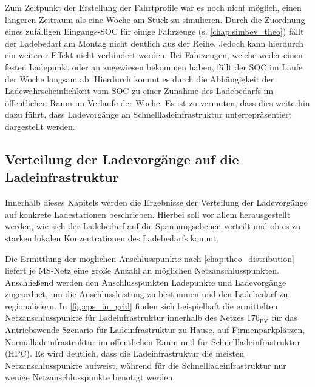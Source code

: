 

Zum Zeitpunkt der Erstellung der Fahrtprofile war es noch nicht möglich, einen längeren Zeitraum als eine Woche am Stück zu simulieren.
Durch die Zuordnung eines zufälligen Eingangs-\gls{SOC} für einige Fahrzeuge (s. \autoref{chap:simbev_theo}) fällt der Ladebedarf am Montag nicht deutlich aus der Reihe.
Jedoch kann hierdurch ein weiterer Effekt nicht verhindert werden.
Bei Fahrzeugen, welche weder einen festen Ladepunkt \zH oder an \Firmeparkplaetzen zugewiesen bekommen haben, fällt der \gls{SOC} im Laufe der Woche langsam ab.
Hierdurch kommt es durch die Abhängigkeit der Ladewahrscheinlichkeit vom \gls{SOC} zu einer Zunahme des Ladebedarfs im öffentlichen Raum im Verlaufe der Woche.
Es ist zu vermuten, dass dies weiterhin dazu führt, dass Ladevorgänge an Schnellladeinfrastruktur un­ter­re­prä­sen­tiert dargestellt werden.


\subsection{Verteilung der Ladevorgänge auf die Ladeinfrastruktur}\label{chap:distribute_demand_ev}

Innerhalb dieses Kapitels werden die Ergebnisse der Verteilung der Ladevorgänge auf konkrete Ladestationen beschrieben.
Hierbei soll vor allem herausgestellt werden, wie sich der Ladebedarf auf die Spannungsebenen verteilt und ob es zu starken lokalen Konzentrationen des Ladebedarfs kommt.\medskip

Die Ermittlung der möglichen Anschlusspunkte nach \autoref{chap:theo_distribution} liefert je \gls{MS}-Netz eine große Anzahl an möglichen Netzanschlusspunkten.
Anschließend werden den Anschlusspunkten Ladepunkte und Ladevorgänge zugeordnet, um die Anschlussleistung zu bestimmen und den Ladebedarf zu regionalisiern.
In \autoref{fig:cps_in_grid} finden sich beispielhaft die ermittelten Netzanschlusspunkte für Ladeinfrastruktur innerhalb des Netzes \(176_{\text{PV}}\) für das Antriebswende-Szenario für Ladeinfrastruktur zu Hause, auf Firmenparkplätzen, Normalladeinfrastruktur im öffentlichen Raum und für Schnellladeinfrastruktur (\gls{HPC}).
Es wird deutlich, dass die Ladeinfrastruktur \zH die meisten Netzanschlusspunkte aufweist, während für die Schnellladeinfrastruktur nur wenige Netzanschlusspunkte benötigt werden.



